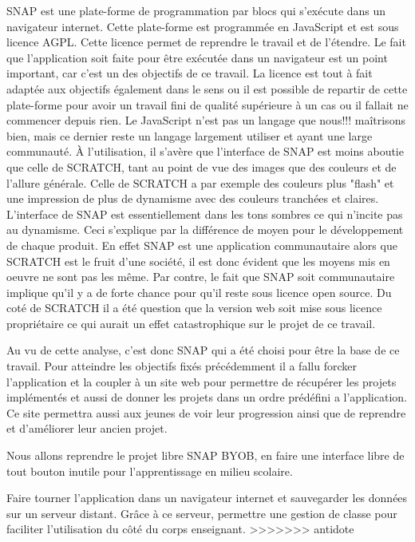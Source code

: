 SNAP est une plate-forme de programmation par blocs qui s'exécute dans un navigateur internet. Cette plate-forme est programmée en JavaScript et est sous licence AGPL. Cette licence permet de reprendre le travail et de l'étendre. Le fait que l'application soit faite pour être exécutée dans un navigateur est un point important, car c'est un des objectifs de ce travail. La licence est tout à fait adaptée aux objectifs également dans le sens ou il est possible de repartir de cette plate-forme pour avoir un travail fini de qualité supérieure à un cas ou il fallait ne commencer depuis rien. Le JavaScript n'est pas un langage que nous!!! maîtrisons bien, mais ce dernier reste un langage largement utiliser et ayant une large communauté.
À l'utilisation, il s'avère que l'interface de SNAP est moins aboutie que celle de SCRATCH, tant au point de vue des images que des couleurs et de l'allure générale. Celle de SCRATCH a par exemple des couleurs plus "flash" et une impression de plus de dynamisme avec des couleurs tranchées et claires. L'interface de SNAP est essentiellement dans les tons sombres ce qui n'incite pas au dynamisme. Ceci s'explique par la différence de moyen pour le développement de chaque produit. En effet SNAP est une application communautaire alors que SCRATCH est le fruit d'une société, il est donc évident que les moyens mis en oeuvre ne sont pas les même. Par contre, le fait que SNAP soit communautaire implique qu'il y a de forte chance pour qu'il reste sous licence open source. Du coté de SCRATCH il a été question que la version web soit mise sous licence propriétaire ce qui aurait un effet catastrophique sur le projet de ce travail.


Au vu de cette analyse, c'est donc SNAP qui a été choisi pour être la base de ce travail. Pour atteindre les objectifs fixés précédemment il a fallu forcker l'application et la coupler à un site web pour permettre de récupérer les projets implémentés et aussi de donner les projets dans un ordre prédéfini a l'application. Ce site permettra aussi aux jeunes de voir leur progression ainsi que de reprendre et d'améliorer leur ancien projet.

Nous allons reprendre le projet libre SNAP BYOB, en faire une interface libre de tout bouton inutile pour l'apprentissage en milieu scolaire. 

Faire tourner l'application dans un navigateur internet et sauvegarder les données sur un serveur distant. Grâce à ce serveur, permettre une gestion de classe pour faciliter l'utilisation du côté du corps enseignant.
>>>>>>> antidote
